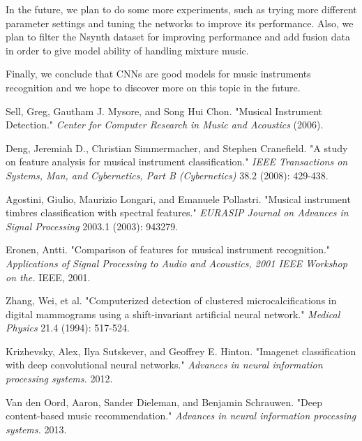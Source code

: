 \documentclass{article}
\begin{document}
\noindent In the future, we plan to do some more experiments, such as trying more different parameter settings and tuning the networks to improve its performance. Also, we plan to filter the Nsynth dataset for improving performance and add fusion data in order to give model ability of handling mixture music.

\noindent Finally, we conclude that CNNs are good models for music instruments recognition and we hope to discover more on this topic in the future.






\begin{thebibliography}{9}

Sell, Greg, Gautham J. Mysore, and Song Hui Chon. "Musical Instrument Detection." \textit{Center for Computer Research in Music and Acoustics} (2006).

Deng, Jeremiah D., Christian Simmermacher, and Stephen Cranefield. "A study on feature analysis for musical instrument classification." \textit{IEEE Transactions on Systems, Man, and Cybernetics, Part B (Cybernetics)} 38.2 (2008): 429-438.

Agostini, Giulio, Maurizio Longari, and Emanuele Pollastri. "Musical instrument timbres classification with spectral features." \textit{EURASIP Journal on Advances in Signal Processing} 2003.1 (2003): 943279.

Eronen, Antti. "Comparison of features for musical instrument recognition." \textit{Applications of Signal Processing to Audio and Acoustics, 2001 IEEE Workshop on the.} IEEE, 2001.

Zhang, Wei, et al. "Computerized detection of clustered microcalcifications in digital mammograms using a shift‐invariant artificial neural network." \textit{Medical Physics} 21.4 (1994): 517-524.

Krizhevsky, Alex, Ilya Sutskever, and Geoffrey E. Hinton. "Imagenet classification with deep convolutional neural networks." \textit{Advances in neural information processing systems.} 2012.

Van den Oord, Aaron, Sander Dieleman, and Benjamin Schrauwen. "Deep content-based music recommendation." \textit{Advances in neural information processing systems.} 2013.


\end{thebibliography}
\end{document}
